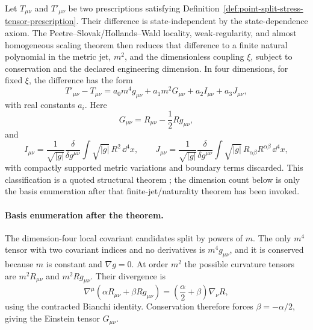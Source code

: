 \begin{quotedtheorem}
\label{prop:finite-local-freedom-scalar-stress-tensor}
Let \(T_{\mu\nu}\) and \(T'_{\mu\nu}\) be two prescriptions satisfying
Definition~\ref{def:point-split-stress-tensor-prescription}.  Their
difference is state-independent by the state-dependence axiom.  The
Peetre--Slovak/Hollands--Wald locality, weak-regularity, and almost
homogeneous scaling theorem then reduces that difference to a finite natural
polynomial in the metric jet, \(m^2\), and the dimensionless coupling \(\xi\),
subject to conservation and the declared engineering dimension.  In four
dimensions, for fixed \(\xi\), the difference has the form
\begin{equation}
  T'_{\mu\nu}-T_{\mu\nu}
  =
  a_0m^4g_{\mu\nu}
  +a_1m^2G_{\mu\nu}
  +a_2I_{\mu\nu}
  +a_3J_{\mu\nu},
  \label{eq:stress-tensor-finite-local-freedom}
\end{equation}
with real constants \(a_i\).  Here
\begin{equation}
  G_{\mu\nu}=R_{\mu\nu}-\frac12Rg_{\mu\nu},
  \label{eq:einstein-tensor-definition-local-freedom}
\end{equation}
and
\begin{equation}
  I_{\mu\nu}
  =
  \frac{1}{\sqrt{|g|}}
  \frac{\delta}{\delta g^{\mu\nu}}
  \int \sqrt{|g|}\,R^2\,\dd^4x,
  \qquad
  J_{\mu\nu}
  =
  \frac{1}{\sqrt{|g|}}
  \frac{\delta}{\delta g^{\mu\nu}}
  \int \sqrt{|g|}\,R_{\alpha\beta}R^{\alpha\beta}\,\dd^4x,
  \label{eq:ij-curvature-tensors-definition}
\end{equation}
with compactly supported metric variations and boundary terms discarded.
This classification is a quoted structural theorem
\cite{HollandsWald2001LocalWick,HollandsWald2005Conservation,
HollandsWald2015QFCS}; the dimension count below is only the basis
enumeration after that finite-jet/naturality theorem has been invoked.
\end{quotedtheorem}

\paragraph{Basis enumeration after the theorem.}
The dimension-four local covariant candidates split by powers of \(m\).  The
only \(m^4\) tensor with two covariant indices and no derivatives is
\(m^4g_{\mu\nu}\), and it is conserved because \(m\) is constant and
\(\nabla g=0\).  At order \(m^2\) the possible curvature tensors are
\(m^2R_{\mu\nu}\) and \(m^2Rg_{\mu\nu}\).  Their divergence is
\[
  \nabla^\mu(\alpha R_{\mu\nu}+\beta Rg_{\mu\nu})
  =
  \left(\frac{\alpha}{2}+\beta\right)\nabla_\nu R,
\]
using the contracted Bianchi identity.  Conservation therefore forces
\(\beta=-\alpha/2\), giving the Einstein tensor \(G_{\mu\nu}\).

